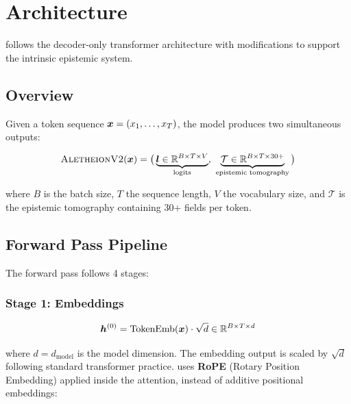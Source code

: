 
\section{Architecture}
\label{sec:architecture}

\aletheion{} follows the decoder-only transformer architecture
\cite{vaswani2017attention, radford2019gpt2} with modifications to
support the intrinsic epistemic system.

\subsection{Overview}

Given a token sequence $\bm{x} = (x_1, \ldots, x_T)$, the model produces
two simultaneous outputs:

\begin{equation}
    \text{\textsc{AletheionV2}{}}(\bm{x}) = \big(\underbrace{\bm{l} \in \mathbb{R}^{B \times T \times V}}_{\text{logits}},\
    \underbrace{\mathcal{T} \in \mathbb{R}^{B \times T \times 30+}}_{\text{epistemic tomography}}\big)
\end{equation}

where $B$ is the batch size, $T$ the sequence length, $V$ the
vocabulary size, and $\mathcal{T}$ is the epistemic tomography containing
30+ fields per token.

\subsection{Forward Pass Pipeline}

The forward pass follows 4 stages:

\subsubsection{Stage 1: Embeddings}

\begin{equation}
    \bm{h}^{(0)} = \text{TokenEmb}(\bm{x}) \cdot \sqrt{d} \in \mathbb{R}^{B \times T \times d}
\end{equation}

where $d = d_{\text{model}}$ is the model dimension. The embedding output
is scaled by $\sqrt{d}$ following standard transformer practice.
\aletheion{} uses
\textbf{RoPE} (Rotary Position Embedding) \cite{su2021roformer}
applied inside the attention, instead of additive positional embeddings:

